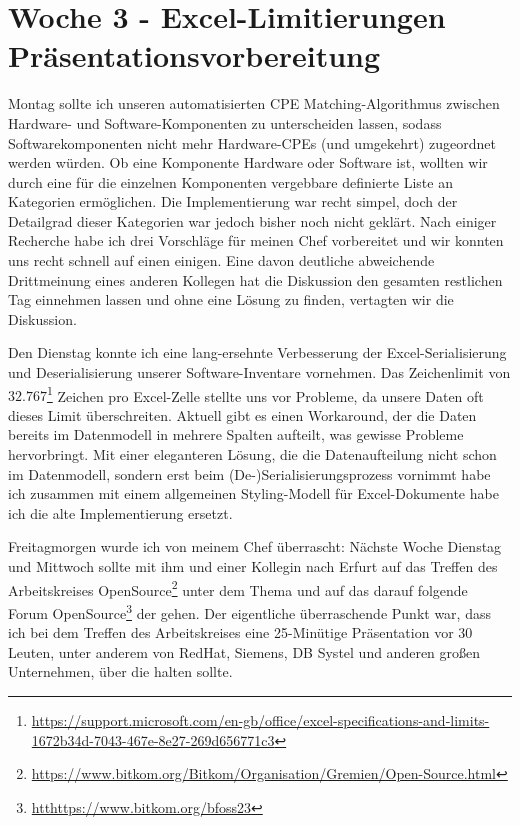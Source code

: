 \section{Woche 3 - Excel-Limitierungen \headerand Präsentationsvorbereitung} \label{sec:bericht-wo-3}


\lweekdaymarginpar{\weekdayMondayLong}

Montag sollte ich unseren automatisierten CPE Matching-Algorithmus zwischen Hardware- und Software-Komponenten zu unterscheiden lassen, sodass Softwarekomponenten nicht mehr Hardware-CPEs (und umgekehrt) zugeordnet werden würden.
Ob eine Komponente Hardware oder Software ist, wollten wir durch eine für die einzelnen Komponenten vergebbare definierte Liste an Kategorien ermöglichen.
Die Implementierung war recht simpel, doch der Detailgrad dieser Kategorien war jedoch bisher noch nicht geklärt.
Nach einiger Recherche habe ich drei Vorschläge für meinen Chef vorbereitet und wir konnten uns recht schnell auf einen einigen.
Eine davon deutliche abweichende Drittmeinung eines anderen Kollegen hat die Diskussion den gesamten restlichen Tag einnehmen lassen und ohne eine Lösung zu finden, vertagten wir die Diskussion.

\sweekdaymarginpar{\weekdayTuesdayShort\ - \weekdayThursdayShort}

Den Dienstag konnte ich eine lang-ersehnte Verbesserung der Excel-Serialisierung und Deserialisierung unserer Software-Inventare vornehmen.
Das Zeichenlimit von $32.767$\footnote{\url{https://support.microsoft.com/en-gb/office/excel-specifications-and-limits-1672b34d-7043-467e-8e27-269d656771c3}} Zeichen pro Excel-Zelle stellte uns vor Probleme, da unsere Daten oft dieses Limit überschreiten.
Aktuell gibt es einen Workaround, der die Daten bereits im Datenmodell in mehrere Spalten aufteilt, was gewisse Probleme hervorbringt.
Mit einer eleganteren Lösung, die die Datenaufteilung nicht schon im Datenmodell, sondern erst beim (De-)Serialisierungsprozess vornimmt habe ich zusammen mit einem allgemeinen Styling-Modell für Excel-Dokumente habe ich die alte Implementierung ersetzt.

\sweekdaymarginpar{\weekdayFridayLong}

Freitagmorgen wurde ich von meinem Chef überrascht:
Nächste Woche Dienstag und Mittwoch sollte mit ihm und einer Kollegin nach Erfurt auf das Treffen des Arbeitskreises OpenSource\footnote{\url{https://www.bitkom.org/Bitkom/Organisation/Gremien/Open-Source.html}} unter dem Thema  und auf das darauf folgende Forum OpenSource\footnote{\url{htthttps://www.bitkom.org/bfoss23}} der {\bitkom} gehen.
Der eigentliche überraschende Punkt war, dass ich bei dem Treffen des Arbeitskreises eine 25-Minütige Präsentation vor 30 Leuten, unter anderem von RedHat, Siemens, DB Systel und anderen großen Unternehmen, über die  halten sollte.

